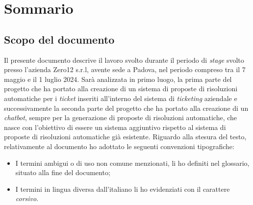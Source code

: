 \cleardoublepage
{}
{}
\begingroup
\let\clearpage\relax
\let\cleardoublepage\relax
\let\cleardoublepage\relax
\chapter*{Sommario}
\section*{Scopo del documento}
Il presente documento descrive il lavoro svolto durante il periodo di \textit{stage} svolto presso l'azienda Zero12 s.r.l, avente sede a Padova, nel periodo compreso tra il 7 maggio e il 1 luglio 2024.
Sarà analizzata in primo luogo, la prima parte del progetto che ha portato alla creazione di un sistema di proposte di risoluzioni automatiche per i \textit{ticket} inseriti all'interno del sistema di \textit{ticketing} aziendale e successivamente
la seconda parte del progetto che ha portato alla creazione di un \textit{chatbot}, sempre per la generazione di proposte di risoluzioni automatiche, che nasce con l'obiettivo di essere un sistema aggiuntivo rispetto al sistema di proposte di risoluzioni automatiche già esistente.
Riguardo alla stesura del testo, relativamente al documento ho adottato le seguenti convenzioni tipografiche:
\begin{itemize}
    \item I termini ambigui o di uso non comune menzionati, li ho definiti nel glossario, situato alla fine del documento;
    \item I termini in lingua diversa dall'italiano li ho evidenziati con il carattere \emph{corsivo}.
\end{itemize}

{}
